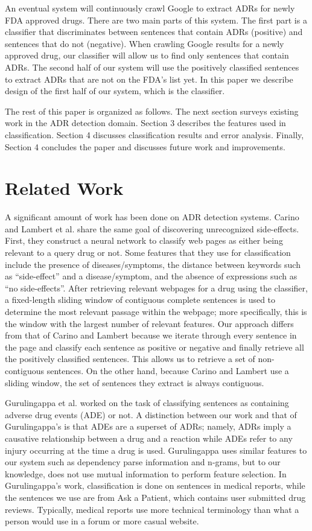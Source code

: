 \documentclass{acm_proc_article-sp}
\begin{document}
An eventual system will continuously crawl Google to extract ADRs for newly FDA approved drugs. There are two main parts of this system. The first part is a classifier that discriminates between sentences that contain ADRs (positive) and sentences that do not (negative). When crawling Google results for a newly approved drug, our classifier will allow us to find only sentences that contain ADRs. The second half of our system will use the positively classified sentences to extract ADRs that are not on the FDA's list yet. In this paper we describe design of the first half of our system, which is the classifier. 

The rest of this paper is organized as follows. The next section surveys existing work in the ADR detection domain. Section 3 describes the features used in classification. Section 4 discusses classification results and error analysis. Finally, Section 4 concludes the paper and discusses future work and improvements.

\section{Related Work}
A significant amount of work has been done on ADR detection systems. Carino and Lambert et al. \cite{Carino} share the same goal of discovering unrecognized side-effects. First, they construct a neural network to classify web pages as either being relevant to a query drug or not. Some features that they use for classification include the presence of diseases/symptoms, the distance between keywords such as ``side-effect'' and a disease/symptom, and the absence of expressions such as ``no side-effects''. After retrieving relevant webpages for a drug using the classifier, a fixed-length sliding window of contiguous complete sentences is used to determine the most relevant passage within the webpage; more specifically, this is the window with the largest number of relevant features. Our approach differs from that of Carino and Lambert because we iterate through every sentence in the page and classify each sentence as positive or negative and finally retrieve all the positively classified sentences. This allows us to retrieve a set of non-contiguous sentences. On the other hand, because Carino and Lambert use a sliding window, the set of sentences they extract is always contiguous. 

Gurulingappa et al. \cite{Gurulingappa} worked on the task of classifying sentences as containing adverse drug events (ADE) or not. A distinction between our work and that of Gurulingappa's is that ADEs are a superset of ADRs; namely, ADRs imply a causative relationship between a drug and a reaction while ADEs refer to any injury occurring at the time a drug is used. Gurulingappa uses similar features to our system such as dependency parse information and n-grams, but to our knowledge, does not use mutual information to perform feature selection. In Gurulingappa's work, classification is done on sentences in medical reports, while the sentences we use are from Ask a Patient, which contains user submitted drug reviews. Typically, medical reports use more technical terminology than what a person would use in a forum or more casual website.
\end{document}
